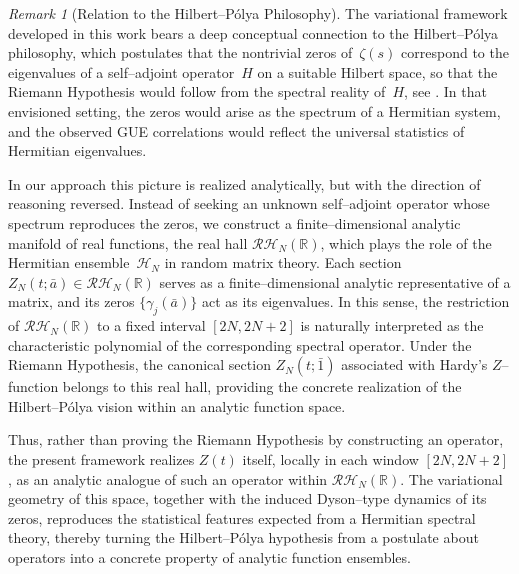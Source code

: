 \documentclass[12pt,reqno]{amsart}
\theoremstyle{plain}
\theoremstyle{definition}
\theoremstyle{remark}
\newtheorem{rem}{Remark}[section]       %
\begin{document}
\begin{rem}[Relation to the Hilbert--Pólya Philosophy]
\label{rem:Hilbert-Polya}
The variational framework developed in this work bears a deep conceptual connection to the
Hilbert--Pólya philosophy, which postulates that the nontrivial zeros of~$\zeta(s)$
correspond to the eigenvalues of a self--adjoint operator~$H$ on a suitable Hilbert space,
so that the Riemann Hypothesis would follow from the spectral reality of~$H$, see \cite{Wolf2020}.
In that envisioned setting, the zeros would arise as the spectrum of a Hermitian system,
and the observed GUE correlations would reflect the universal statistics of Hermitian eigenvalues.

In our approach this picture is realized analytically, but with the direction of reasoning reversed.
Instead of seeking an unknown self--adjoint operator whose spectrum reproduces the zeros,
we construct a finite--dimensional analytic manifold of real functions,
the real hall $\mathcal{RH}_N(\mathbb{R})$,
which plays the role of the Hermitian ensemble~$\mathcal{H}_N$ in random matrix theory.
Each section $Z_N(t;\bar a)\in\mathcal{RH}_N(\mathbb{R})$
serves as a finite--dimensional analytic representative of a matrix,
and its zeros $\{\gamma_j(\bar a)\}$ act as its eigenvalues.
In this sense, the restriction of $\mathcal{RH}_N(\mathbb{R})$ to a fixed interval $[2N,2N+2]$
is naturally interpreted as the characteristic polynomial
of the corresponding spectral operator.
Under the Riemann Hypothesis, the canonical section $Z_N(t;\bar 1)$ associated with
Hardy’s $Z$--function belongs to this real hall, providing the concrete realization of
the Hilbert--Pólya vision within an analytic function space.

Thus, rather than proving the Riemann Hypothesis by constructing an operator,
the present framework realizes $Z(t)$ itself, locally in each window $[2N,2N+2]$,
as an analytic analogue of such an operator within $\mathcal{RH}_N(\mathbb{R})$.
The variational geometry of this space, together with the induced Dyson--type
dynamics of its zeros, reproduces the statistical features expected from a
Hermitian spectral theory, thereby turning the Hilbert--Pólya hypothesis
from a postulate about operators into a concrete property of analytic function ensembles.
\end{rem}




\end{document}
